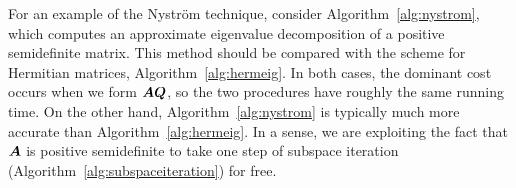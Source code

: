 \documentclass[final]{siamltex}
\newcounter{algorithm}[section]
\newcommand{\pgnotate}[1]{{\color{blue}[#1]}}
\begin{document}
For an example of the Nystr{\"o}m technique, consider Algorithm~\ref{alg:nystrom}, which computes an approximate eigenvalue decomposition of a positive semidefinite matrix.  This method should be compared with the scheme for Hermitian matrices, Algorithm~\ref{alg:hermeig}.
In both cases, the dominant cost occurs when we form $\bm{AQ}$, so the two procedures have roughly the same running time.  On the other hand, Algorithm~\ref{alg:nystrom} is typically much more accurate than Algorithm~\ref{alg:hermeig}.  In a sense, we are exploiting the fact that $\bm{A}$ is positive semidefinite to take one step of subspace iteration (Algorithm~\ref{alg:subspaceiteration}) for free.

\begin{figure}[tb]
\begin{center}
\end{center}
\end{figure}
\end{document}
